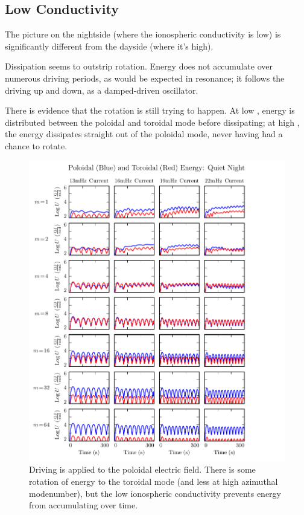\subsection{Low Conductivity}

The picture on the nightside (where the ionospheric conductivity is low) is significantly different from the dayside (where it's high). 

Dissipation seems to outstrip rotation. Energy does not accumulate over numerous driving periods, as would be expected in resonance; it follows the driving up and down, as a damped-driven oscillator. 

There is evidence that the rotation is still trying to happen. At low \azm, energy is distributed between the poloidal and toroidal mode before dissipating; at high \azm, the energy dissipates straight out of the poloidal mode, never having had a chance to rotate. 

\begin{figure}[H]
    \centering
    \includegraphics[width=\textwidth]{figures/U_4.pdf}
    \caption[Poloidal and Toroidal Energy: Quiet Night]{
      Driving is applied to the poloidal electric field. There is some rotation of energy to the toroidal mode (and less at high azimuthal modenumber), but the low ionospheric conductivity prevents energy from accumulating over time. 
    }
    \label{fig_U_night}
\end{figure}

